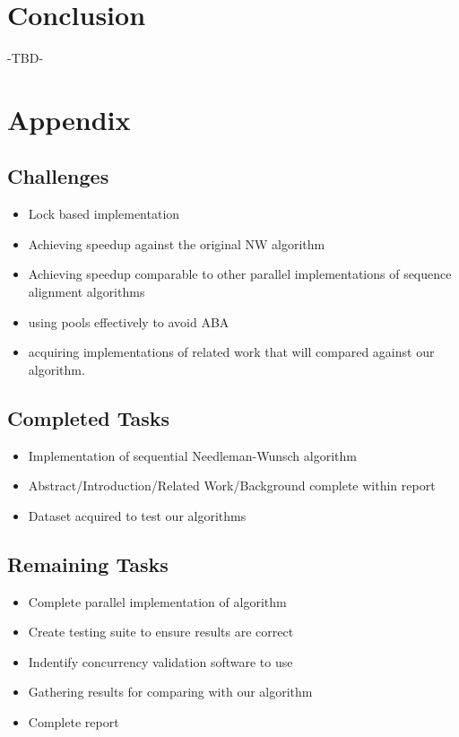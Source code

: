 \documentclass[letterpaper, 10 pt, conference]{IEEEconf}
\begin{document}
\section{Conclusion}
-TBD-

\section{Appendix}
\subsection{Challenges}
\begin{itemize}
	\item
	Lock based implementation
	\item
	Achieving speedup against the original NW algorithm
	\item 
	Achieving speedup comparable to other parallel implementations of sequence alignment algorithms
	\item
	using pools effectively to avoid ABA
	\item 
	acquiring implementations of related work that will compared against our algorithm. 
\end{itemize}

\subsection{Completed Tasks}
\begin{itemize}
	\item
	Implementation of sequential Needleman-Wunsch algorithm
	\item
	Abstract/Introduction/Related Work/Background complete within report
	\item
	Dataset acquired to test our algorithms
\end{itemize}


\subsection{Remaining Tasks}
\begin{itemize}
	\item
	Complete parallel implementation of algorithm
	\item
	Create testing suite to ensure results are correct
	\item
	Indentify concurrency validation software to use
	\item
	Gathering results for comparing with our algorithm
	\item
	Complete report
\end{itemize}
\end{document}
